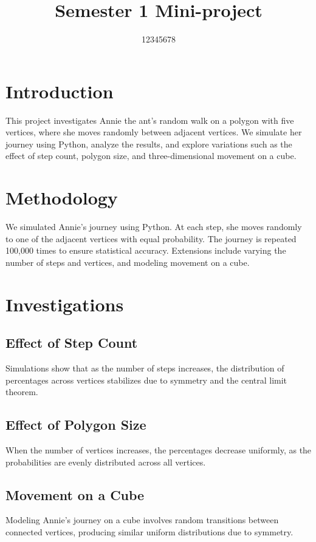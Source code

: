 \documentclass[a4paper,11pt]{amsart}
\begin{document}
\title{Semester 1 Mini-project}
\author{12345678}
\maketitle

\section{Introduction}
This project investigates Annie the ant's random walk on a polygon with five vertices, where she moves randomly between adjacent vertices. We simulate her journey using Python, analyze the results, and explore variations such as the effect of step count, polygon size, and three-dimensional movement on a cube.

\section{Methodology}
We simulated Annie's journey using Python. At each step, she moves randomly to one of the adjacent vertices with equal probability. The journey is repeated 100,000 times to ensure statistical accuracy. Extensions include varying the number of steps and vertices, and modeling movement on a cube.

\section{Investigations}
\subsection{Effect of Step Count}
Simulations show that as the number of steps increases, the distribution of percentages across vertices stabilizes due to symmetry and the central limit theorem.

\subsection{Effect of Polygon Size}
When the number of vertices increases, the percentages decrease uniformly, as the probabilities are evenly distributed across all vertices.

\subsection{Movement on a Cube}
Modeling Annie’s journey on a cube involves random transitions between connected vertices, producing similar uniform distributions due to symmetry.
\end{document}
